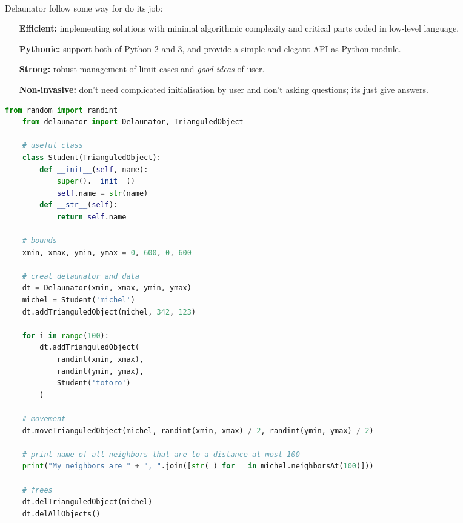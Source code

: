 \documentclass{report}
\begin{document}
    \paragraph*{}
    Delaunator follow some way for do its job:
    \begin{enumerate}
        \item[\textbf{Efficient:}] implementing solutions with minimal algorithmic complexity and critical parts coded in low-level language.
        \item[\textbf{Pythonic:}] support both of Python 2 and 3, and provide a simple and elegant API as Python module.
        \item[\textbf{Strong:}] robust management of limit cases and \textit{good ideas} of user.
        \item[\textbf{Non-invasive:}] don't need complicated initialisation by user and don't asking questions; its just give answers.
    \end{enumerate}
    \newpage
    \begin{lstlisting}[language=python]
    from random import randint
    from delaunator import Delaunator, TrianguledObject

    # useful class
    class Student(TrianguledObject): 
        def __init__(self, name):
            super().__init__()
            self.name = str(name)
        def __str__(self):
            return self.name

    # bounds
    xmin, xmax, ymin, ymax = 0, 600, 0, 600

    # creat delaunator and data
    dt = Delaunator(xmin, xmax, ymin, ymax)
    michel = Student('michel')
    dt.addTrianguledObject(michel, 342, 123)

    for i in range(100):
        dt.addTrianguledObject(
            randint(xmin, xmax), 
            randint(ymin, ymax), 
            Student('totoro')
        )

    # movement
    dt.moveTrianguledObject(michel, randint(xmin, xmax) / 2, randint(ymin, ymax) / 2)
    
    # print name of all neighbors that are to a distance at most 100
    print("My neighbors are " + ", ".join([str(_) for _ in michel.neighborsAt(100)]))
    
    # frees
    dt.delTrianguledObject(michel)
    dt.delAllObjects()
    \end{lstlisting}



\end{document}
